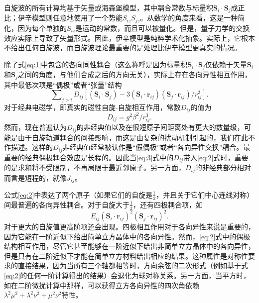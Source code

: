 \documentclass{article}
\begin{document}
自旋波的所有计算均基于矢量或海森堡模型，其中耦合常数与标量积$\mathbf{S}_{i}\cdot\mathbf{S}_{j}$成正比；伊辛模型则任意地使用了一个势能$S_{iz}S_{jz}$。从数学的角度来看，这是一种简化，因为每个单独的$S_{iz}$是运动的常数，而且可以被量化。但是，量子力学的交换效应实际上导致了矢量形式。因此，伊辛模型是纯粹学术化抽象。实际上，它根本不给出任何自旋波，而自旋波理论最重要的是处理比伊辛模型更真实的情况。

除了式\eqref{eq:1}中包含的各向同性耦合（这么称呼是因为标量积$\mathbf{S}_{i}\cdot\mathbf{S}_{j}$仅依赖于矢量$\mathbf{S}_i$和$\mathbf{S}_j$之间的角度，与他们合成之后的方向无关），实际上存在各向异性相互作用，其中最低次项是“偶极”或者“张量”结构
\begin{equation} \label{eq:2}
\sum\nolimits_{j>i}D_{\mathit{ij}}[(\mathbf{S}_i\cdot\mathbf{S}_j)-3(\mathbf{S}_i\cdot\mathbf{r}_{\mathit{ij}})(\mathbf{S}_j\cdot\mathbf{r}_{\mathit{ij}})/r_{\mathit{ij}}^2].
\end{equation}
对于经典电磁学，即真实的磁性自旋-自旋相互作用，常数$D_{ij}$的值为
\begin{equation} \label{eq:3} 
D_{\mathit{ij}}=g^2\beta^2/r_\mathit{ij}^3.
\end{equation}
然而，现在普遍认为$D_{ij}$的非经典值以及在很短原子间距离处有更大的数量级，可能是由于自旋轨道耦合的间接影响，而这是由复杂的扰动机制引起的，我们在此不作描述。这样的$D_{ij}$非经典值经常被认作是“假偶极”或者“各向异性交换”耦合。最重要的经典偶极耦合效应是长程的。因此当\eqref{eq:3}式中的$D_{ij}$带入\eqref{eq:2}式时，重要的是求和将不受限制，不再局限于最近邻原子。另一方面，$D_{ij}$的非经典部分相对而言是短程的，就像$J_{ij}$。

公式\eqref{eq:2}中表达了两个原子（如果它们的自旋是$\frac{1}{2}$，并且关于它们中心连线对称）间最普遍的各向异性耦合。对于自旋大于$\frac{1}{2}$，还有四极耦合项，如
\begin{equation*}
E_\mathit{ij}(\mathbf{S}_i\cdot\mathbf{r}_\mathit{ij})^2(\mathbf{S}_j\cdot\mathbf{r}_\mathit{ij})^2.
\end{equation*}
对于更大的自旋值更高阶项还会出现。四极相互作用对于各向异性来说是重要的，因为它能在一阶近似下给出简单立方晶体中的各向异性。然而，\eqref{eq:2}式中的偶极结构相互作用，尽管它甚至能够在一阶近似下给出非简单立方晶体中的各向异性，但是只有在二阶近似下才能在简单立方材料给出相应的结果。这种属性是对称性要求的直接结果，因为当所有三个轴都相等时，方向余弦的二次形式（例如基于式\eqref{eq:2}的任何一阶计算得出的结果）会退化为球对称关系。另一方面，当平方时，如在二阶微扰计算中那样，可以获得立方各向异性的四次角依赖$\lambda^2\mu^2+\lambda^2\nu^2+\mu^2\nu^2$特性。
\end{document}
